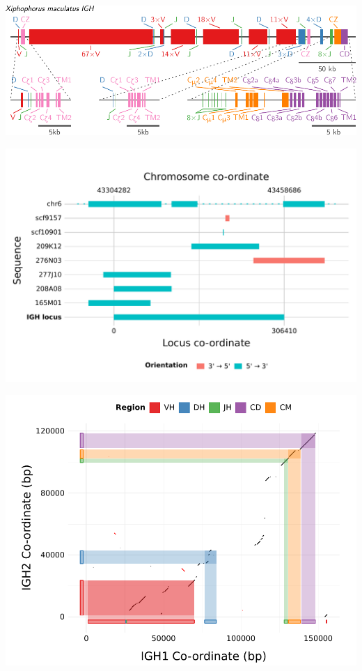 \documentclass[presentation]{beamer}
\begin{document}
\begin{frame}
\includegraphics[width=\textwidth]{figs/pdf/extra/locus-map-xma}
\end{frame}

\begin{frame}
\includegraphics[width=\textwidth]{figs/pdf/extra/nfu-locus-aln}
\end{frame}

\begin{frame}
\centering
\includegraphics[width=\textheight]{figs/pdf/extra/nfu-locus-dots}
\end{frame}
\end{document}
